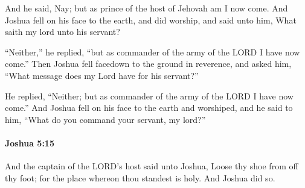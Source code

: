 			\begin{versebox}
					\item[BHS] 
					\item[ASV] And he said, Nay; but as prince of the host of Jehovah am I now come. And Joshua fell on his face to the earth, and did worship, and said unto him, What saith my lord unto his servant?
					\item[NIV] “Neither,” he replied, “but as commander of the army of the LORD I have now come.” Then Joshua fell facedown to the ground in reverence, and asked him, “What message does my Lord have for his servant?”
					\item[NRSV] He replied, “Neither; but as commander of the army of the LORD I have now come.” And Joshua fell on his face to the earth and worshiped, and he said to him, “What do you command your servant, my lord?”
			\end{versebox}

		\paragraph{Joshua 5:15} %
			\label{JOSHUA-5-15}

			And the captain of the LORD’s host said unto Joshua, Loose thy shoe from off thy foot; for the place whereon thou standest is holy. And Joshua did so.

